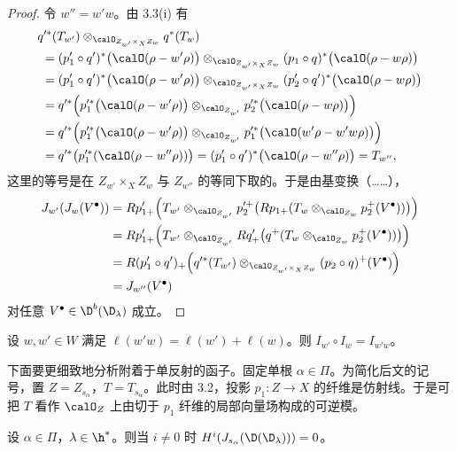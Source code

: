\begin{proof}
令 $w''=w'w$。由 3.3(i) 有
{\small
\begin{align*}
&q'^*(T_{w'})\otimes_{\calO_{Z_{w'}\times_X Z_w}}q^*(T_w)\\
&\ = (p'_1\circ q')^*\bigl(\calO(\rho-w'\rho)\bigr)\otimes_{\calO_{Z_{w'}\times_X Z_w}}(p_1\circ q)^*\bigl(\calO(\rho-w\rho)\bigr)\\
&\ = (p'_1\circ q')^*\bigl(\calO(\rho-w'\rho)\bigr)\otimes_{\calO_{Z_{w'}\times_X Z_w}}(p'_2\circ q')^*\bigl(\calO(\rho-w\rho)\bigr)\\
&\ = q'^*\Bigl(p'^*_1\bigl(\calO(\rho-w'\rho)\bigr)\otimes_{\calO_{Z_{w'}}}p'^*_2\bigl(\calO(\rho-w\rho)\bigr)\Bigr)\\
&\ = q'^*\Bigl(p'^*_1\bigl(\calO(\rho-w'\rho)\bigr)\otimes_{\calO_{Z_{w'}}}p'^*_1\bigl(\calO(w'\rho-w'w\rho)\bigr)\Bigr)\\
&\ = q'^*\bigl(p'^*_1(\calO(\rho-w''\rho))\bigr)=(p'_1\circ q')^*\bigl(\calO(\rho-w''\rho)\bigr)=T_{w''},
\end{align*}}
这里的等号是在 $Z_{w'}\times_X Z_w$ 与 $Z_{w''}$ 的等同下取的。于是由基变换（……），
{\small
\begin{align*}
J_{w'}(J_w(V^\bullet))
&=Rp'_{1+}\Bigl(T_{w'}\otimes_{\calO_{Z_{w'}}}p'^+_2\bigl(Rp_{1+}(T_w\otimes_{\calO_{Z_w}}p_2^+(V^\bullet))\bigr)\Bigr)\\
&=Rp'_{1+}\Bigl(T_{w'}\otimes_{\calO_{Z_{w'}}}Rq'_{+}\bigl(q^+(T_w\otimes_{\calO_{Z_w}}p_2^+(V^\bullet))\bigr)\Bigr)\\
&=R(p'_1\circ q')_{+}\Bigl(q'^*(T_{w'})\otimes_{\calO_{Z_{w'}\times_X Z_w}}(p_2\circ q)^+(V^\bullet)\Bigr)\\
&=J_{w''}(V^\bullet)
\end{align*}}
对任意 $V^\bullet\in\D^b(\D_\lambda)$ 成立。
\end{proof}

\begin{corollary}\label{cor:03.3.8}
设 $w,w'\in W$ 满足 $\ell(w'w)=\ell(w')+\ell(w)$。则 $I_{w'}\circ I_w=I_{w'w}$。
\end{corollary}

下面要更细致地分析附着于单反射的函子。固定单根 $\alpha\in\Pi$。为简化后文的记号，置 $Z=Z_{s_\alpha}$，$T=T_{s_\alpha}$。此时由 3.2，投影 $p_1:Z\to X$ 的纤维是仿射线。于是可把 $T$ 看作 $\calO_Z$ 上由切于 $p_1$ 纤维的局部向量场构成的可逆模。

\begin{lemma}\label{lem:03.3.9}
设 $\alpha\in\Pi$，$\lambda\in\h^*$。则当 $i\neq 0$ 时 $H^i(J_{s_\alpha}(\D(\D_\lambda)))=0$。
\end{lemma}

